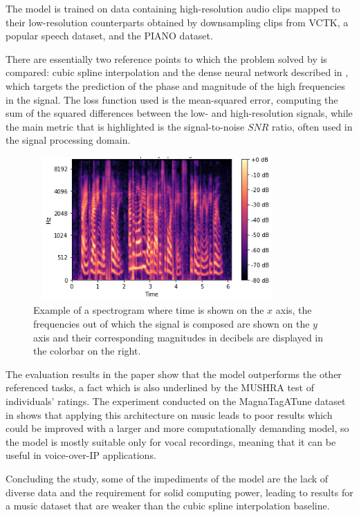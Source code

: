 \documentclass[conference]{IEEEtran}
\begin{document}
	The model is trained on data containing high-resolution audio clips mapped to their low-resolution counterparts obtained by downsampling clips from VCTK, a popular speech dataset, and the PIANO dataset.

	There are essentially two reference points to which the problem solved by \textcite{kuleshov2017audio} is compared: cubic spline interpolation and the dense neural network described in \textcite{lietal2015}, which targets the prediction of the phase and magnitude of the high frequencies in the signal. The loss function used is the mean-squared error, computing the sum of the squared differences between the low- and high-resolution signals, while the main metric that is highlighted is the signal-to-noise $ SNR $ ratio, often used in the signal processing domain.

\begin{figure}[htbp]
		\centerline{\includegraphics[width=9.5cm,height=5.5cm]{spectrogram.png}}
\caption{Example of a spectrogram where time is shown on the $ x $ axis, the frequencies out of which the signal is composed are shown on the $ y $ axis and their corresponding magnitudes in decibels are displayed in the colorbar on the right.}
\label{fig}
\end{figure}

	The evaluation results in the paper show that the model outperforms the other referenced tasks, a fact which is also underlined by the MUSHRA test of individuals' ratings. The experiment conducted on the MagnaTagATune dataset in \textcite{kuleshov2017audio} shows that applying this architecture on music leads to poor results which could be improved with a larger and more computationally demanding model, so the model is mostly suitable only for vocal recordings, meaning that it can be useful in voice-over-IP applications.

	Concluding the study, some of the impediments of the model are the lack of diverse data and the requirement for solid computing power, leading to results for a music dataset that are weaker than the cubic spline interpolation baseline.
\end{document}
